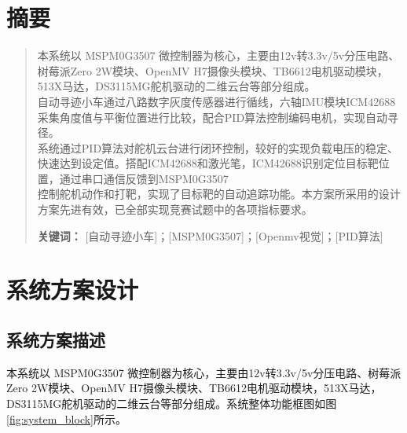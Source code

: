 \documentclass[UTF-8,zihao=-4]{ctexart}
\begin{document}
\section*{摘要}
\begin{quote}
    \noindent
    本系统以 MSPM0G3507 微控制器为核心，主要由12v转3.3v/5v分压电路、树莓派Zero 2W模块、OpenMV H7摄像头模块、TB6612电机驱动模块，513X马达，DS3115MG舵机驱动的二维云台等部分组成。
    \\自动寻迹小车通过八路数字灰度传感器进行循线，六轴IMU模块ICM42688采集角度值与平衡位置进行比较，配合PID算法控制编码电机，实现自动寻径。
    \\系统通过PID算法对舵机云台进行闭环控制，较好的实现负载电压的稳定、快速达到设定值。搭配ICM42688和激光笔，ICM42688识别定位目标靶位置，通过串口通信反馈到MSPM0G3507
    \\控制舵机动作和打靶，实现了目标靶的自动追踪功能。本方案所采用的设计方案先进有效，已全部实现竞赛试题中的各项指标要求。

    \vspace{1cm}
    \noindent
    \textbf{关键词：} [自动寻迹小车]；[MSPM0G3507]；[Openmv视觉]；[PID算法] %
\end{quote}

\newpage
\tableofcontents
\newpage


\section{系统方案设计}
\subsection{系统方案描述}
    本系统以 MSPM0G3507 微控制器为核心，主要由12v转3.3v/5v分压电路、树莓派Zero 2W模块、OpenMV H7摄像头模块、TB6612电机驱动模块，513X马达，DS3115MG舵机驱动的二维云台等部分组成。系统整体功能框图如图\ref{fig:system_block}所示。
    
\end{document}
